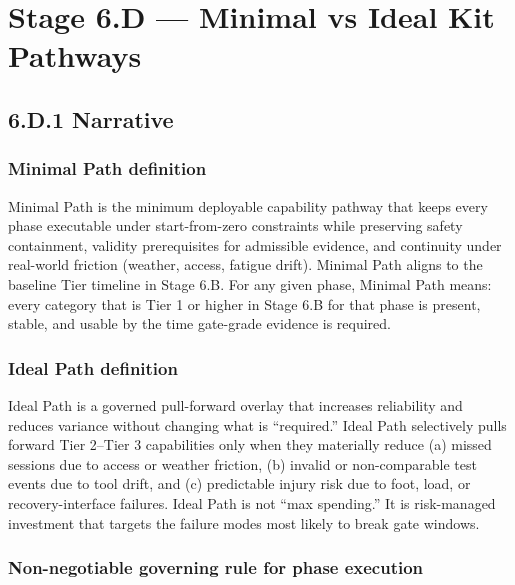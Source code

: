 \documentclass[10pt]{article}
\begin{document}
\section*{Stage 6.D — Minimal vs Ideal Kit Pathways}
{}

\subsection*{6.D.1 Narrative}
{}

\subsubsection*{Minimal Path definition}

Minimal Path is the minimum deployable capability pathway that keeps every phase executable under start-from-zero constraints while preserving safety containment, validity prerequisites for admissible evidence, and continuity under real-world friction (weather, access, fatigue drift). Minimal Path aligns to the baseline Tier timeline in Stage 6.B. For any given phase, Minimal Path means: every category that is Tier 1 or higher in Stage 6.B for that phase is present, stable, and usable by the time gate-grade evidence is required.

\subsubsection*{Ideal Path definition}

Ideal Path is a governed pull-forward overlay that increases reliability and reduces variance without changing what is “required.” Ideal Path selectively pulls forward Tier 2–Tier 3 capabilities only when they materially reduce (a) missed sessions due to access or weather friction, (b) invalid or non-comparable test events due to tool drift, and (c) predictable injury risk due to foot, load, or recovery-interface failures. Ideal Path is not “max spending.” It is risk-managed investment that targets the failure modes most likely to break gate windows.

\subsubsection*{Non-negotiable governing rule for phase execution}
\end{document}
